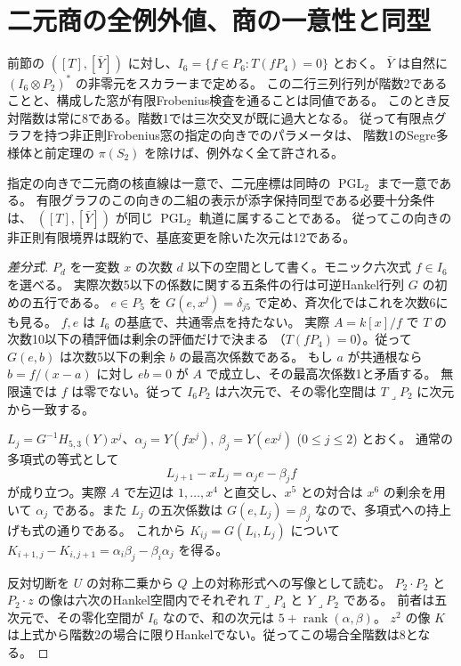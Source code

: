 \section{二元商の全例外値、商の一意性と同型}
\label{sec:binary-apolar-rank-test}
\begin{theorem}\label{thm:binary-apolar-rank-test}
前節の $([T],[\bar Y])$ に対し、$I_6=\{f\in P_6:T(fP_4)=0\}$ とおく。
$\bar Y$ は自然に $(I_6\otimes P_2)^*$ の非零元をスカラーまで定める。
この二行三列行列が階数2であることと、構成した窓が有限Frobenius検査を通ることは同値である。
このとき反対階数は常に8である。階数1では三次交叉が既に過大となる。
従って有限点グラフを持つ非正則Frobenius窓の指定の向きでのパラメータは、
階数1のSegre多様体と前定理の $\pi(S_2)$ を除けば、例外なく全て許される。

指定の向きで二元商の核直線は一意で、二元座標は同時の $\operatorname{PGL}_2$ まで一意である。
有限グラフのこの向きの二組の表示が添字保持同型である必要十分条件は、
$([T],[\bar Y])$ が同じ $\operatorname{PGL}_2$ 軌道に属することである。
従ってこの向きの非正則有限境界は既約で、基底変更を除いた次元は12である。
\end{theorem}
\begin{proof}[差分式]
$P_d$ を一変数 $x$ の次数 $d$ 以下の空間として書く。モニック六次式 $f\in I_6$ を選べる。
実際次数5以下の係数に関する五条件の行は可逆Hankel行列 $G$ の初めの五行である。
$e\in P_5$ を $G(e,x^j)=\delta_{j5}$ で定め、斉次化ではこれを次数6にも見る。
$f,e$ は $I_6$ の基底で、共通零点を持たない。
実際 $A=k[x]/f$ で $T$ の次数10以下の積評価は剰余の評価だけで決まる
（$T(fP_4)=0$）。従って $G(e,b)$ は次数5以下の剰余 $b$ の最高次係数である。
もし $a$ が共通根なら $b=f/(x-a)$ に対し $eb=0$ が $A$ で成立し、その最高次係数1と矛盾する。
無限遠では $f$ は零でない。従って $I_6P_2$ は六次元で、その零化空間は
$T\mathbin{\lrcorner}P_2$ に次元から一致する。

$L_j=G^{-1}H_{5,3}(Y)x^j$、$\alpha_j=Y(fx^j),\ \beta_j=Y(ex^j)$ ($0\le j\le2$) とおく。
通常の多項式の等式として
\[
                L_{j+1}-xL_j=\alpha_j e-\beta_j f
\]
が成り立つ。実際 $A$ で左辺は $1,\ldots,x^4$ と直交し、$x^5$ との対合は
$x^6$ の剰余を用いて $\alpha_j$ である。また $L_j$ の五次係数は
$G(e,L_j)=\beta_j$ なので、多項式への持上げも式の通りである。
これから $K_{ij}=G(L_i,L_j)$ について
$K_{i+1,j}-K_{i,j+1}=\alpha_i\beta_j-\beta_i\alpha_j$ を得る。

反対切断を $U$ の対称二乗から $Q$ 上の対称形式への写像として読む。
$P_2\cdot P_2$ と $P_2\cdot z$ の像は六次のHankel空間内でそれぞれ
$T\mathbin{\lrcorner}P_4$ と $Y\mathbin{\lrcorner}P_2$ である。
前者は五次元で、その零化空間が $I_6$ なので、和の次元は $5+\operatorname{rank}(\alpha,\beta)$。
$z^2$ の像 $K$ は上式から階数2の場合に限りHankelでない。従ってこの場合全階数は8となる。
\end{proof}
